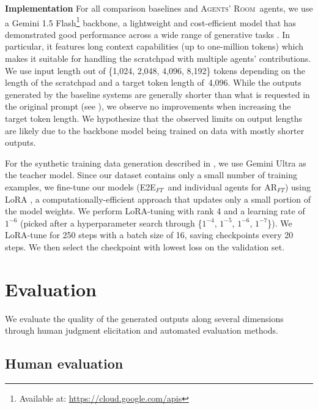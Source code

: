 \documentclass{article}
\newcommand{\Agentsroom}{\textsc{Agents' Room}}
\newcommand{\agentsroomft}{{\sc AR$_{FT}$}}
\newcommand{\baselineft}{{\sc E2E$_{FT}$}}
\newcommand{\mirella}[1]{{\textcolor{cyan}{\bf{Mirella:} \emph{#1}}}}
\begin{document}
\textbf{Implementation}
For all comparison baselines and \Agentsroom\ agents, we use a Gemini
1.5 Flash\footnote{Available at: \url{https://cloud.google.com/apis}}
backbone, a lightweight and cost-efficient model that has demonstrated
good performance across a wide range of generative tasks
\citep{reid2024gemini}.  In particular, it features long context
capabilities (up to one-million tokens) which makes it suitable for
handling the scratchpad with multiple agents’ contributions. We use
input length out of \{1,024, 2,048, 4,096, 8,192\} tokens depending on
the length of the scratchpad and a target token length of~4,096. While
the outputs generated by the baseline systems are generally shorter
than what is requested in the original prompt (see
), we observe no improvements when increasing the
target token length. We hypothesize that the observed limits on output
lengths are likely due to the backbone model being trained on data
with mostly shorter outputs.

For the synthetic training data generation described in
, we use Gemini Ultra\footnotemark[4]
\citep{team2023gemini} as the teacher model.
Since our dataset contains only a small number of training examples,
we fine-tune our models (\baselineft\ and individual agents for
\agentsroomft) using LoRA \citep{hu2021lora}, a
computationally-efficient approach that updates only a small portion
of the model weights. We perform LoRA-tuning with rank 4 and a
learning rate of $1^{-6}$ (picked after a hyperparameter search
through \{$1^{-4}$, $1^{-5}$, $1^{-6}$, $1^{-7}$\}). We LoRA-tune for
250 steps with a batch size of 16, saving checkpoints every 20
steps. We then select the checkpoint with lowest loss on the
validation set.



\section{Evaluation}
\label{sec:evaluation}

We evaluate the quality of the generated outputs along several dimensions through human judgment elicitation and automated evaluation methods.

\subsection{Human evaluation}
\label{sec:human-eval}

\end{document}
